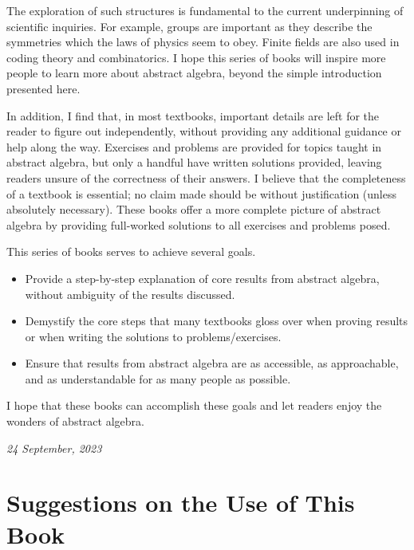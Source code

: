 The exploration of such structures is fundamental to the current underpinning of scientific inquiries. For example, groups are important as they describe the symmetries which the laws of physics seem to obey. Finite fields are also used in coding theory and combinatorics. I hope this series of books will inspire more people to learn more about abstract algebra, beyond the simple introduction presented here.

In addition, I find that, in most textbooks, important details are left for the reader to figure out independently, without providing any additional guidance or help along the way. Exercises and problems are provided for topics taught in abstract algebra, but only a handful have written solutions provided, leaving readers unsure of the correctness of their answers. I believe that the completeness of a textbook is essential; no claim made should be without justification (unless absolutely necessary). These books offer a more complete picture of abstract algebra by providing full-worked solutions to all exercises and problems posed.

This series of books serves to achieve several goals.
\begin{itemize}
    \item Provide a step-by-step explanation of core results from abstract algebra, without ambiguity of the results discussed.
    \item Demystify the core steps that many textbooks gloss over when proving results or when writing the solutions to problems/exercises.
    \item Ensure that results from abstract algebra are as accessible, as approachable, and as understandable for as many people as possible.
\end{itemize}
I hope that these books can accomplish these goals and let readers enjoy the wonders of abstract algebra.

\hfill{\textit{24 September, 2023}}

\chapter{Suggestions on the Use of This Book}
